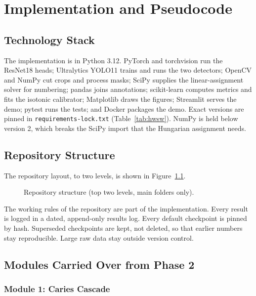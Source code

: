 \chapter{Implementation and Pseudocode}
\label{ch:impl}

\section{Technology Stack}

The implementation is in Python 3.12. PyTorch and torchvision run the ResNet18 heads; Ultralytics
YOLO11 trains and runs the two detectors; OpenCV and NumPy cut crops and process masks; SciPy supplies
the linear-assignment solver for numbering; pandas joins annotations; scikit-learn computes metrics and
fits the isotonic calibrator; Matplotlib draws the figures; Streamlit serves the demo; pytest runs the
tests; and Docker packages the demo. Exact versions are pinned in \texttt{requirements-lock.txt}
(Table~\ref{tab:hwsw}). NumPy is held below version 2, which breaks the SciPy import that the
Hungarian assignment needs.

\section{Repository Structure}

The repository layout, to two levels, is shown in Figure~\ref{fig:repotree}.

\begin{figure}[!htbp]
\centering

\caption[Repository structure]{Repository structure (top two levels, main folders only).}
\label{fig:repotree}
\end{figure}

The working rules of the repository are part of the implementation. Every result is logged in a
dated, append-only results log. Every default checkpoint is pinned by hash. Superseded checkpoints are
kept, not deleted, so that earlier numbers stay reproducible. Large raw data stay outside version
control.

\section{Modules Carried Over from Phase 2}

\subsection{Module 1: Caries Cascade}

